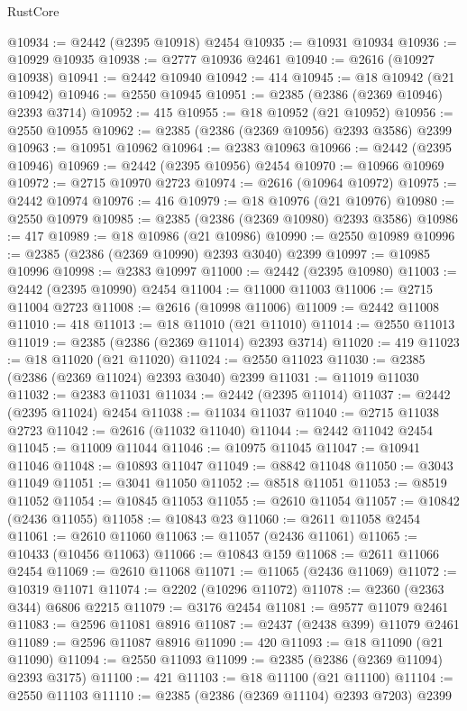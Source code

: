 \begin{lexlean}{RustCore}
\begin{coremodule}
@10934 := @2442 (@2395 @10918) @2454
@10935 := @10931 @10934
@10936 := @10929 @10935
@10938 := @2777 @10936 @2461
@10940 := @2616 (@10927 @10938)
@10941 := @2442 @10940
@10942 := 414
@10945 := @18 @10942 (@21 @10942)
@10946 := @2550 @10945
@10951 := @2385 (@2386 (@2369 @10946) @2393 @3714)
@10952 := 415
@10955 := @18 @10952 (@21 @10952)
@10956 := @2550 @10955
@10962 := @2385 (@2386 (@2369 @10956) @2393 @3586) @2399
@10963 := @10951 @10962
@10964 := @2383 @10963
@10966 := @2442 (@2395 @10946)
@10969 := @2442 (@2395 @10956) @2454
@10970 := @10966 @10969
@10972 := @2715 @10970 @2723
@10974 := @2616 (@10964 @10972)
@10975 := @2442 @10974
@10976 := 416
@10979 := @18 @10976 (@21 @10976)
@10980 := @2550 @10979
@10985 := @2385 (@2386 (@2369 @10980) @2393 @3586)
@10986 := 417
@10989 := @18 @10986 (@21 @10986)
@10990 := @2550 @10989
@10996 := @2385 (@2386 (@2369 @10990) @2393 @3040) @2399
@10997 := @10985 @10996
@10998 := @2383 @10997
@11000 := @2442 (@2395 @10980)
@11003 := @2442 (@2395 @10990) @2454
@11004 := @11000 @11003
@11006 := @2715 @11004 @2723
@11008 := @2616 (@10998 @11006)
@11009 := @2442 @11008
@11010 := 418
@11013 := @18 @11010 (@21 @11010)
@11014 := @2550 @11013
@11019 := @2385 (@2386 (@2369 @11014) @2393 @3714)
@11020 := 419
@11023 := @18 @11020 (@21 @11020)
@11024 := @2550 @11023
@11030 := @2385 (@2386 (@2369 @11024) @2393 @3040) @2399
@11031 := @11019 @11030
@11032 := @2383 @11031
@11034 := @2442 (@2395 @11014)
@11037 := @2442 (@2395 @11024) @2454
@11038 := @11034 @11037
@11040 := @2715 @11038 @2723
@11042 := @2616 (@11032 @11040)
@11044 := @2442 @11042 @2454
@11045 := @11009 @11044
@11046 := @10975 @11045
@11047 := @10941 @11046
@11048 := @10893 @11047
@11049 := @8842 @11048
@11050 := @3043 @11049
@11051 := @3041 @11050
@11052 := @8518 @11051
@11053 := @8519 @11052
@11054 := @10845 @11053
@11055 := @2610 @11054
@11057 := @10842 (@2436 @11055)
@11058 := @10843 @23
@11060 := @2611 @11058 @2454
@11061 := @2610 @11060
@11063 := @11057 (@2436 @11061)
@11065 := @10433 (@10456 @11063)
@11066 := @10843 @159
@11068 := @2611 @11066 @2454
@11069 := @2610 @11068
@11071 := @11065 (@2436 @11069)
@11072 := @10319 @11071
@11074 := @2202 (@10296 @11072)
@11078 := @2360 (@2363 @344) @6806 @2215
@11079 := @3176 @2454
@11081 := @9577 @11079 @2461
@11083 := @2596 @11081 @8916
@11087 := @2437 (@2438 @399) @11079 @2461
@11089 := @2596 @11087 @8916
@11090 := 420
@11093 := @18 @11090 (@21 @11090)
@11094 := @2550 @11093
@11099 := @2385 (@2386 (@2369 @11094) @2393 @3175)
@11100 := 421
@11103 := @18 @11100 (@21 @11100)
@11104 := @2550 @11103
@11110 := @2385 (@2386 (@2369 @11104) @2393 @7203) @2399

\end{coremodule}
\end{lexlean}
